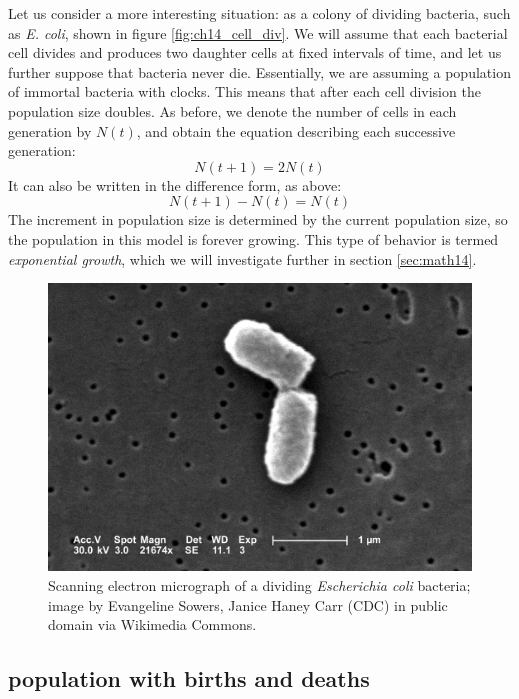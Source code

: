 \documentclass[
  letterpaper,
  DIV=11,
  numbers=noendperiod]{scrreprt}
\begin{document}
Let us consider a more interesting situation: as a colony of dividing
bacteria, such as \emph{E. coli}, shown in figure
\ref{fig:ch14_cell_div}. We will assume that each bacterial cell divides
and produces two daughter cells at fixed intervals of time, and let us
further suppose that bacteria never die. Essentially, we are assuming a
population of immortal bacteria with clocks.
This means that after each cell division the
population size doubles. As before, we denote the number of cells in
each generation by \(N(t)\), and obtain the equation describing each
successive generation: \[ N(t+1) = 2N(t)\] It can also be written in the
difference form, as above: \[ N(t+1) - N(t) = N(t) \] The increment in
population size is determined by the current population size, so the
population in this model is forever growing. This type of behavior is
termed  
\emph{exponential growth}, which we will investigate further in section
\ref{sec:math14}.

\begin{figure}

{\centering \includegraphics{./ch14/Ecoli_dividing.png}

}

\caption{Scanning electron micrograph of a dividing \emph{Escherichia
coli} bacteria; image by Evangeline Sowers, Janice Haney Carr (CDC) in
public domain via Wikimedia Commons.}

\end{figure}

\hypertarget{population-with-births-and-deaths}{%
\subsection{population with births and
deaths}\label{population-with-births-and-deaths}}
\end{document}
